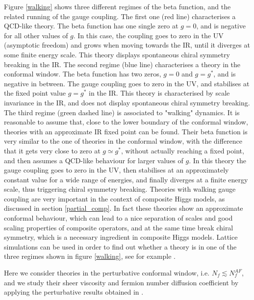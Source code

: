 Figure \ref{walking} shows three different regimes of the beta function, and the related running of the gauge coupling. The first one (red line) characterises a QCD-like theory. The beta function has one single zero at $g=0$, and is negative for all other values of $g$. In this case, the coupling goes to zero in the UV (asymptotic freedom) and grows when moving towards the IR, until it diverges at some finite energy scale. This theory displays spontaneous chiral symmetry breaking in the IR. The second regime (blue line) characterises a theory in the conformal window. The beta function has two zeros, $g=0$ and $g=g^*$, and is negative in between. The gauge coupling goes to zero in the UV, and stabilises at the fixed point value $g=g^*$ in the IR. This theory is characterised by scale invariance in the IR, and does not display spontaneous chiral symmetry breaking. The third regime (green dashed line) is associated to "walking" dynamics. It is reasonable to assume that, close to the lower boundary of the conformal window, theories with an approximate IR fixed point can be found. Their beta function is very similar to the one of theories in the conformal window, with the difference that it gets very close to zero at $g\simeq g^*$, without actually reaching a fixed point, and then assumes a QCD-like behaviour for larger values of $g$. In this theory the gauge coupling goes to zero in the UV, then stabilises at an approximately constant value for a wide range of energies, and finally diverges at a finite energy scale, thus triggering chiral symmetry breaking. Theories with walking gauge coupling are very important in the context of composite Higgs models, as discussed in section \ref{partial_comp}. In fact these theories show an approximate conformal behaviour, which can lead to a nice separation of scales and good scaling properties of composite operators, and at the same time break chiral symmetry, which is a necessary ingredient in composite Higgs models.
Lattice simulations can be used in order to find out whether a theory is in one of the three regimes shown in figure \ref{walking}, see for example \cite{Hietanen:2008mr,Hansen:2017ejh}.

Here we consider theories in the perturbative conformal window, i.e. $N_f \lesssim N_f^{AF}$, and we study their sheer viscosity and fermion number diffusion coefficient by applying the perturbative results obtained in \cite{Arnold:2000dr}.


